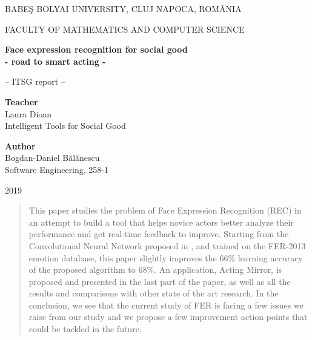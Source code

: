 \documentclass[runningheads,a4paper,11pt]{report}
\begin{document}
\begin{titlepage}
\sloppy
\begin{center}
BABE\c S BOLYAI UNIVERSITY, CLUJ NAPOCA, ROM\^ ANIA

FACULTY OF MATHEMATICS AND COMPUTER SCIENCE

\vspace{5cm}

\Huge \textbf
{
Face expression recognition for social good \\
- road to smart acting -
}

\vspace{1cm}

\normalsize -- ITSG report --

\end{center}


\vspace{4cm}

\begin{flushleft}
\Large{\textbf{Teacher}}\\
Laura Dioan\\
Intelligent Tools for Social Good
\end{flushleft}

\begin{flushright}
\Large{\textbf{Author}}\\
Bogdan-Daniel B\u{a}l\u{a}nescu\\
Software Engineering, 258-1
\end{flushright}

\vspace{3cm}

\begin{center}
2019
\end{center}

\end{titlepage}


\begin{abstract}
	This paper studies the problem of Face Expression Recognition (REC) in an attempt to build a tool that helps novice actors better analyze their performance and get real-time feedback to improve. Starting from the Convolutional Neural Network proposed in \cite{Arriaga17}, and trained on the FER-2013 emotion database, this paper slightly improves the 66\% learning accuracy of the proposed algorithm to 68\%. An application, Acting Mirror, is proposed and presented in the last part of the paper, as well as all the results and comparisons with other state of the art research. In the conclusion, we see that the current study of FER is facing a few issues we raise from our study and we propose a few improvement action points that could be tackled in the future.
\end{abstract}
\end{document}
